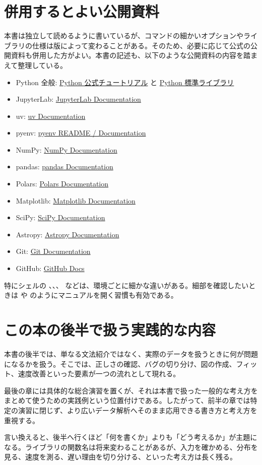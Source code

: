 \section{併用するとよい公開資料}

本書は独立して読めるように書いているが、コマンドの細かいオプションやライブラリの仕様は版によって変わることがある。そのため、必要に応じて公式の公開資料も併用した方がよい。本書の記述も、以下のような公開資料の内容を踏まえて整理している。

\begin{itemize}
\item Python 全般: \href{https://docs.python.org/3/tutorial/}{Python 公式チュートリアル} と \href{https://docs.python.org/3/library/}{Python 標準ライブラリ}
\item JupyterLab: \href{https://jupyterlab.readthedocs.io/}{JupyterLab Documentation}
\item uv: \href{https://docs.astral.sh/uv/}{uv Documentation}
\item pyenv: \href{https://github.com/pyenv/pyenv}{pyenv README / Documentation}
\item NumPy: \href{https://numpy.org/doc/stable/}{NumPy Documentation}
\item pandas: \href{https://pandas.pydata.org/docs/}{pandas Documentation}
\item Polars: \href{https://docs.pola.rs/}{Polars Documentation}
\item Matplotlib: \href{https://matplotlib.org/stable/}{Matplotlib Documentation}
\item SciPy: \href{https://docs.scipy.org/doc/scipy/}{SciPy Documentation}
\item Astropy: \href{https://docs.astropy.org/}{Astropy Documentation}
\item Git: \href{https://git-scm.com/doc}{Git Documentation}
\item GitHub: \href{https://docs.github.com/}{GitHub Docs}
\end{itemize}

特にシェルの 、、、 などは、環境ごとに細かな違いがある。細部を確認したいときは  や  のようにマニュアルを開く習慣も有効である。

\section{この本の後半で扱う実践的な内容}

本書の後半では、単なる文法紹介ではなく、実際のデータを扱うときに何が問題になるかを扱う。そこでは、正しさの確認、バグの切り分け、図の作成、フィット、速度改善といった要素が一つの流れとして現れる。

最後の章には具体的な総合演習を置くが、それは本書で扱った一般的な考え方をまとめて使うための実践例という位置付けである。したがって、前半の章では特定の演習に閉じず、より広いデータ解析へそのまま応用できる書き方と考え方を重視する。

言い換えると、後半へ行くほど「何を書くか」よりも「どう考えるか」が主題になる。ライブラリの関数名は将来変わることがあるが、入力を確かめる、分布を見る、速度を測る、遅い理由を切り分ける、といった考え方は長く残る。
